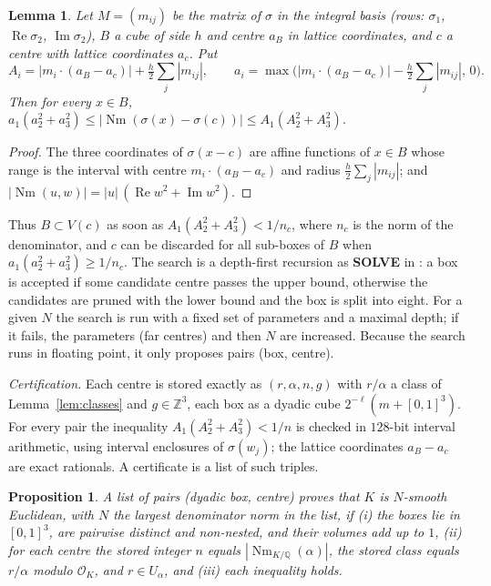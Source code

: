 \documentclass[11pt]{amsart}
\newtheorem{proposition}[theorem]{Proposition}
\newtheorem{lemma}[theorem]{Lemma}
\theoremstyle{definition}
\theoremstyle{remark}
\numberwithin{equation}{section}
\newcommand{\Q}{\mathbb{Q}}
\newcommand{\Z}{\mathbb{Z}}
\newcommand{\cO}{\mathcal{O}}
\newcommand{\Nm}{\operatorname{Nm}}
\begin{document}
\begin{lemma}\label{lem:box}
Let $M=(m_{ij})$ be the matrix of $\sigma$ in the integral basis (rows: $\sigma_1$,
$\operatorname{Re}\sigma_2$, $\operatorname{Im}\sigma_2$), $B$ a cube of side $h$ and centre
$a_B$ in lattice coordinates, and $c$ a centre with lattice coordinates $a_c$. Put
\[
  A_i=\bigl|m_i\cdot(a_B-a_c)\bigr|+\tfrac h2\textstyle\sum_j|m_{ij}|,\qquad
  a_i=\max\bigl(|m_i\cdot(a_B-a_c)|-\tfrac h2\textstyle\sum_j|m_{ij}|,\,0\bigr).
\]
Then for every $x\in B$,
$a_1(a_2^2+a_3^2)\le|\Nm(\sigma(x)-\sigma(c))|\le A_1(A_2^2+A_3^2)$.
\end{lemma}

\begin{proof}
The three coordinates of $\sigma(x-c)$ are affine functions of $x\in B$ whose range is the
interval with centre $m_i\cdot(a_B-a_c)$ and radius $\tfrac h2\sum_j|m_{ij}|$; and
$|\Nm(u,w)|=|u|\,(\operatorname{Re}w^2+\operatorname{Im}w^2)$.
\end{proof}

Thus $B\subset V(c)$ as soon as $A_1(A_2^2+A_3^2)<1/n_c$, where $n_c$ is the norm of the
denominator, and $c$ can be discarded for all sub-boxes of $B$ when $a_1(a_2^2+a_3^2)\ge 1/n_c$.
The search is a depth-first recursion as \textbf{SOLVE} in \cite{GM}: a box is accepted if some
candidate centre passes the upper bound, otherwise the candidates are pruned with the lower
bound and the box is split into eight. For a given $N$ the search is run with a fixed set of
parameters and a maximal depth; if it fails, the parameters (far centres) and then $N$ are
increased. Because the search runs in floating point, it only proposes pairs (box, centre).

\emph{Certification.} Each centre is stored exactly as $(r,\alpha,n,g)$ with $r/\alpha$ a class
of Lemma~\ref{lem:classes} and $g\in\Z^3$, each box as a dyadic cube $2^{-\ell}(m+[0,1]^3)$. For
every pair the inequality $A_1(A_2^2+A_3^2)<1/n$ is checked in $128$-bit interval arithmetic,
using interval enclosures of $\sigma(w_j)$; the lattice coordinates $a_B-a_c$ are exact
rationals. A certificate is a list of such triples.

\begin{proposition}\label{prop:verify}
A list of pairs (dyadic box, centre) proves that $K$ is $N$-smooth Euclidean, with $N$ the
largest denominator norm in the list, if (i) the boxes lie in $[0,1]^3$, are pairwise distinct
and non-nested, and their volumes add up to $1$, (ii) for each centre the stored integer $n$
equals $|\Nm_{K/\Q}(\alpha)|$, the stored class equals $r/\alpha$ modulo $\cO_K$, and
$r\in U_\alpha$, and (iii) each inequality holds.
\end{proposition}
\end{document}

